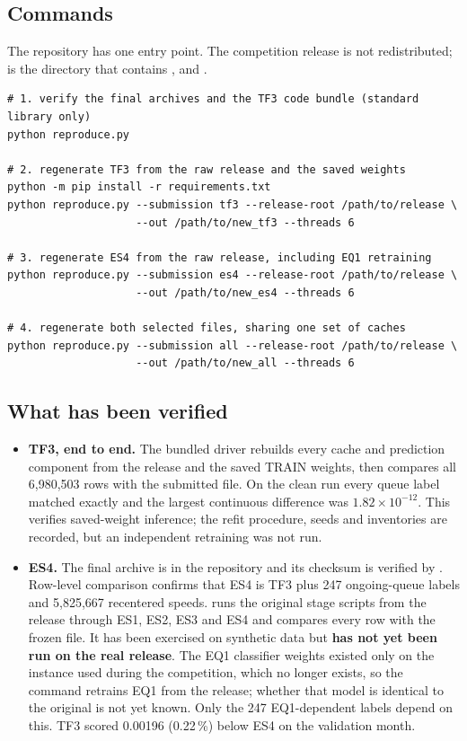 \subsection{Commands}
The repository has one entry point. The competition release is not redistributed;  is the
directory that contains ,  and .

\smallskip
\noindent\begin{minipage}{\linewidth}
\small
\begin{verbatim}
# 1. verify the final archives and the TF3 code bundle (standard library only)
python reproduce.py

# 2. regenerate TF3 from the raw release and the saved weights
python -m pip install -r requirements.txt
python reproduce.py --submission tf3 --release-root /path/to/release \
                    --out /path/to/new_tf3 --threads 6

# 3. regenerate ES4 from the raw release, including EQ1 retraining
python reproduce.py --submission es4 --release-root /path/to/release \
                    --out /path/to/new_es4 --threads 6

# 4. regenerate both selected files, sharing one set of caches
python reproduce.py --submission all --release-root /path/to/release \
                    --out /path/to/new_all --threads 6
\end{verbatim}
\end{minipage}

\subsection{What has been verified}
\begin{itemize}
  \item \textbf{TF3, end to end.} The bundled driver rebuilds every cache and prediction component from the release
        and the saved TRAIN weights, then compares all 6,980,503 rows with the submitted file. On the clean run every queue
        label matched exactly and the largest continuous difference was $1.82\times10^{-12}$. This verifies saved-weight
        inference; the refit procedure, seeds and inventories are recorded, but an independent retraining was not run.
  \item \textbf{ES4.} The final archive is in the repository and its checksum is verified by \code{reproduce.py}.
        Row-level comparison confirms that ES4 is TF3 plus 247 ongoing-queue labels and 5,825,667 recentered speeds.
        \code{code/regenerate\_es4.py} runs the original stage scripts from the release through ES1, ES2, ES3 and ES4 and
        compares every row with the frozen file. It has been exercised on synthetic data but \textbf{has not yet been run
        on the real release}. The EQ1 classifier weights existed only on the instance used during the competition, which
        no longer exists, so the command retrains EQ1 from the release; whether that model is identical to the original
        is not yet known. Only the 247 EQ1-dependent labels depend on this. TF3 scored 0.00196 (0.22\,\%) below ES4 on the
        validation month.
\end{itemize}

